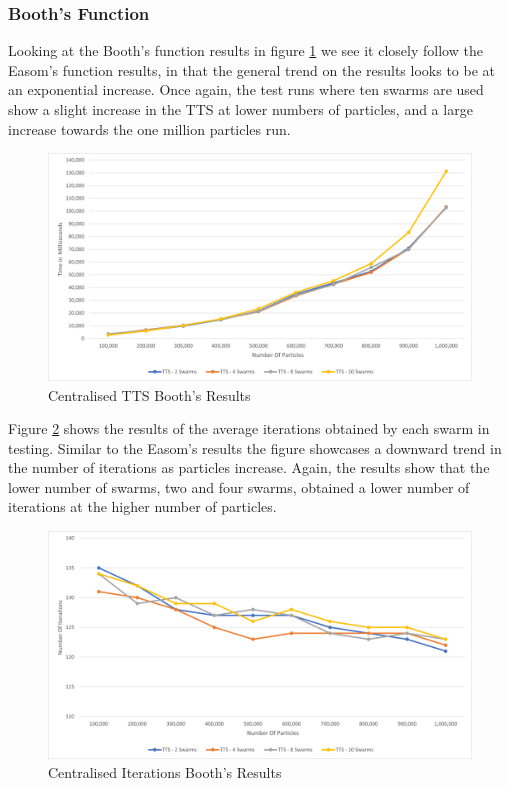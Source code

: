 \documentclass[oneside,12pt]{book}
\begin{document}
\subsubsection{Booth's Function}
Looking at the Booth's function results in figure \ref{fig:Centralised_TTS_Booths_Results} we see it closely follow the Easom's function results, in that the general trend on the results looks to be at an exponential increase. Once again, the test runs where ten swarms are used show a slight increase in the TTS at lower numbers of particles, and a large increase towards the one million particles run.

\begin{figure}[H]
    \centering
    \includegraphics[scale=0.45]{Images/Graphs/CentralisedBoothsTTS.png}
    \caption{Centralised TTS Booth's Results}
    \label{fig:Centralised_TTS_Booths_Results}
\end{figure}

Figure \ref{fig:Centralised_Epoc_Booths_Results} shows the results of the average iterations obtained by each swarm in testing. Similar to the Easom's results the figure showcases a downward trend in the number of iterations as particles increase. Again, the results show that the lower number of swarms, two and four swarms, obtained a lower number of iterations at the higher number of particles. 

\begin{figure}[H]
    \centering
    \includegraphics[scale=0.45]{Images/Graphs/CentralisedBoothsEpoch.png}
    \caption{Centralised Iterations Booth's Results}
    \label{fig:Centralised_Epoc_Booths_Results}
\end{figure}
\end{document}
